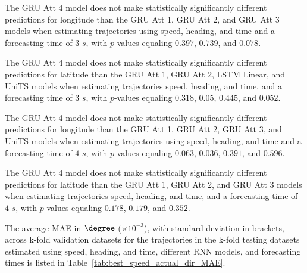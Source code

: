 The GRU Att 4 model does not make statistically significantly different predictions for longitude than the GRU Att 1, GRU Att 2, and GRU Att 3 models when estimating trajectories using speed, heading, and time and a forecasting time of $3$ $s$, with $p$-values equaling $0.397$, $0.739$, and $0.078$.

The GRU Att 4 model does not make statistically significantly different predictions for latitude than the GRU Att 1, GRU Att 2, LSTM Linear, and UniTS models when estimating trajectories speed, heading, and time, and a forecasting time of $3$ $s$, with $p$-values equaling $0.318$, $0.05$, $0.445$, and $0.052$.

The GRU Att 4 model does not make statistically significantly different predictions for longitude than the GRU Att 1, GRU Att 2, GRU Att 3, and UniTS models when estimating trajectories using speed, heading, and time and a forecasting time of $4$ $s$, with $p$-values equaling $0.063$, $0.036$, $0.391$, and $0.596$.

The GRU Att 4 model does not make statistically significantly different predictions for latitude than the GRU Att 1, GRU Att 2, and GRU Att 3 models when estimating trajectories speed, heading, and time, and a forecasting time of $4$ $s$, with $p$-values equaling $0.178$, $0.179$, and $0.352$.

The average MAE in $\degree$ ($\times 10^{-3}$), with standard deviation in brackets, across k-fold validation datasets for the trajectories in the k-fold testing datasets estimated using speed, heading, and time, different RNN models, and forecasting times is listed in Table~\ref{tab:best_speed_actual_dir_MAE}.

